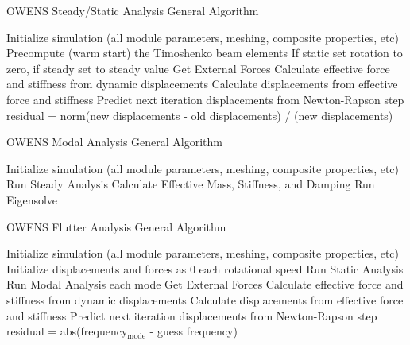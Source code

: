 \documentclass[11pt]{article}
\begin{document}
\begin{algorithm}
\caption{OWENS Steady/Static Analysis General Algorithm}
\begin{spacing}{1.18}
\begin{algorithmic}[1]

\State Initialize simulation (all module parameters, meshing, composite properties, etc)
\State Precompute (warm start) the Timoshenko beam elements
\State If static set rotation to zero, if steady set to steady value
	\State Get External Forces
	\State Calculate effective force and stiffness from dynamic displacements
	\State Calculate displacements from effective force and stiffness
	\State Predict next iteration displacements from Newton-Rapson step
	\State residual = norm(new displacements - old displacements) / (new displacements)
\EndWhile
\end{algorithmic}
\end{spacing}
\label{alg:Steady}
\end{algorithm}


\begin{algorithm}
\caption{OWENS Modal Analysis General Algorithm}
\begin{spacing}{1.18}
\begin{algorithmic}[1]

\State Initialize simulation (all module parameters, meshing, composite properties, etc)
\State Run Steady Analysis
\State Calculate Effective Mass, Stiffness, and Damping
\State Run Eigensolve

\end{algorithmic}
\end{spacing}
\label{alg:Modal}
\end{algorithm}

\begin{algorithm}
\caption{OWENS Flutter Analysis General Algorithm}
\begin{spacing}{1.18}
\begin{algorithmic}[1]
\State Initialize simulation (all module parameters, meshing, composite properties, etc)
\State Initialize displacements and forces as 0
\For each rotational speed
	\State Run Static Analysis
	\State Run Modal Analysis
	\For each mode
			\State Get External Forces
			\State Calculate effective force and stiffness from dynamic displacements
			\State Calculate displacements from effective force and stiffness
			\State Predict next iteration displacements from Newton-Rapson step
			\State residual = abs(frequency$_\text{mode}$ - guess frequency)
		\EndWhile
	\EndFor
\EndFor

\end{algorithmic}
\end{spacing}
\label{alg:Flutter}
\end{algorithm}
\end{document}
